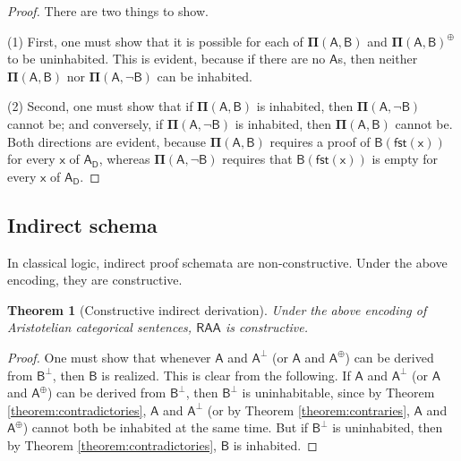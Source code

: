 \documentclass{article}
\newtheorem{theorem}{Theorem}
\newcommand\e{\mathsf}
\def\Empty/{\e{\bot}}
\def\x/{\e{x}}
\def\A/{\e{A}}
\def\B/{\e{B}}
\def\Domain/{\e{D}}
\newcommand\Contradictory[1]{\e{#1^{\Empty/}}}
\newcommand\Contrary[1]{\e{#1^{\oplus}}}
\newcommand\Dep[2]{\e{#1(#2)}}
\newcommand\First[1]{\e{fst(#1)}}
\newcommand\Gen[2]{\e{#1_{#2}}}
\newcommand\PI[2]{\mathbf{\Pi}\e{(#1, #2)}}
\def\RAA/{$\e{RAA}$}
\begin{document}
\begin{proof}
  There are two things to show. 
  
  (1) First, one must show that it is possible for each of $\PI{A}{B}$ and $\Contrary{\PI{A}{B}}$ to be uninhabited. This is evident, because if there are no $\A/$s, then neither $\PI{A}{B}$ nor $\PI{A}{\lnot B}$ can be inhabited.
  
  (2) Second, one must show that if $\PI{A}{B}$ is inhabited, then $\PI{A}{\lnot B}$ cannot be; and conversely, if $\PI{A}{\lnot B}$ is inhabited, then $\PI{A}{B}$ cannot be. Both directions are evident, because $\PI{A}{B}$ requires a proof of $\Dep{B}{\First{x}}$ for every $\x/$ of $\Gen{A}{\Domain/}$, whereas $\PI{A}{\lnot B}$ requires that $\Dep{B}{\First{x}}$ is empty for every $\x/$ of $\Gen{A}{\Domain/}$.
\end{proof}



\subsection{Indirect schema}

In classical logic, indirect proof schemata are non-constructive. Under the above encoding, they are constructive.

\begin{theorem}[Constructive indirect derivation]
  Under the above encoding of Aristotelian categorical sentences, \RAA/ is constructive.
\end{theorem}

\begin{proof}
  One must show that whenever $\A/$ and $\Contradictory{A}$ (or $\A/$ and $\Contrary{A}$) can be derived from $\Contradictory{B}$, then $\B/$ is realized. This is clear from the following. If $\A/$ and $\Contradictory{A}$ (or $\A/$ and $\Contrary{A}$) can be derived from $\Contradictory{B}$, then $\Contradictory{B}$ is uninhabitable, since by Theorem \ref{theorem:contradictories}, $\A/$ and $\Contradictory{A}$ (or by Theorem \ref{theorem:contraries}, $\A/$ and $\Contrary{A}$) cannot both be inhabited at the same time. But if $\Contradictory{B}$ is uninhabited, then by Theorem \ref{theorem:contradictories}, $\B/$ is inhabited.
\end{proof}


\end{document}
